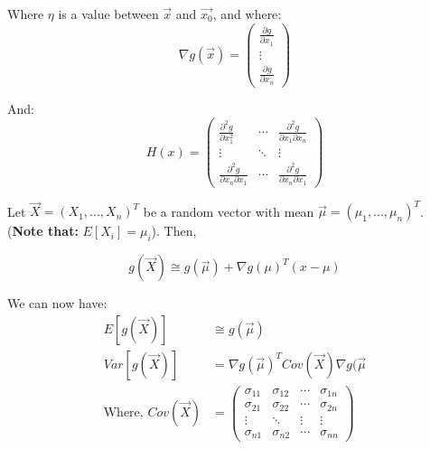 \documentclass{article}
\begin{document}
    Where $\eta$ is a value between $\vec{x}$ and $\vec{x_0}$, and where:
    \begin{equation*}
        \nabla g(\vec{x}) = \begin{pmatrix}
            \frac{\partial g}{\partial x_1} \\
            \vdots \\
            \frac{\partial g}{\partial x_n} 
        \end{pmatrix}
    \end{equation*}
    
    And:
    \begin{equation*}
        H(x)= \begin{pmatrix}
            \frac{\partial^2 g}{\partial x_1^2} & \cdots & \frac{\partial^2 g}{\partial x_1 \partial x_n} \\
            \vdots  & \ddots & \vdots\\
            \frac{\partial^2 g}{\partial x_n \partial x_1}  & \cdots & \frac{\partial^2 g}{\partial x_n \partial x_1}
        \end{pmatrix}
    \end{equation*}
    
   
    
   \noindent Let $\vec{X} = (X_1,...,X_n)^T$ be a random vector with mean $\vec{\mu} = (\mu_1,...,\mu_n)^T$. (\textbf{Note that:} $E[X_i] = \mu_i$). Then,
    
    \begin{equation*}
        g(\vec{X}) \cong g(\vec{\mu}) + \nabla g(\mu)^T(x-\mu)
    \end{equation*}
    
    \noindent We can now have:
    \begin{equation*}
        \begin{split}
            E[g(\vec{X})] &\cong g(\vec{\mu})\\
            Var[g(\vec{X})] &= \nabla g(\vec{\mu})^T Cov(\vec{X}) \nabla g(\vec{\mu}\\
          \text{Where, }  Cov(\vec{X}) &= \begin{pmatrix}
                \sigma_{11} & \sigma_{12} & \cdots & \sigma_{1n}\\
                \sigma_{21} & \sigma_{22} & \cdots & \sigma_{2n}\\
                \vdots & \ddots & \vdots & \vdots\\
                \sigma_{n1} & \sigma_{n2} & \cdots & \sigma_{nn}
            \end{pmatrix}
        \end{split}
    \end{equation*}
    
\end{document}
